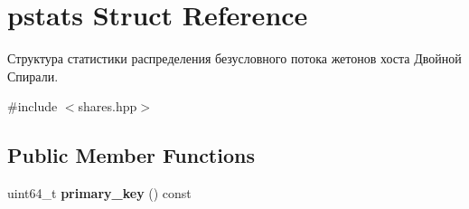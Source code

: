\hypertarget{structpstats}{}\section{pstats Struct Reference}
\label{structpstats}


Структура статистики распределения безусловного потока жетонов хоста Двойной Спирали.  




{\ttfamily \#include $<$shares.\+hpp$>$}

\subsection*{Public Member Functions}
\begin{DoxyCompactItemize}
\item 
\mbox{\label{structpstats_a6ec34c82ee16baa47636693356b443d8}} 
uint64\+\_\+t {\bfseries primary\+\_\+key} () const
\end{DoxyCompactItemize}
